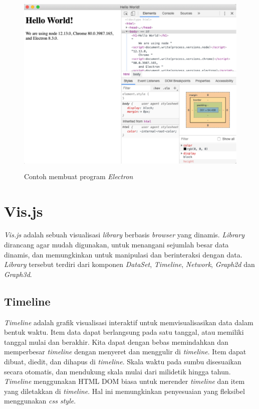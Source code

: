 \begin{enumerate}
    \begin{figure}[H]
        \centering
        \includegraphics[width=12cm, height=9cm]{Gambar/hasilContohProgramElectron.png}
        \caption{Contoh membuat program \textit{Electron}}
        \label{fig:gambarElectron}
    \end{figure}
\end{enumerate}

\section{Vis.js}
\textit{Vis.js} adalah sebuah visualisasi \textit{library} berbasis \textit{browser} yang dinamis. \textit{Library} dirancang agar mudah digunakan, untuk menangani sejumlah besar data dinamis, dan memungkinkan untuk manipulasi dan berinteraksi dengan data. \textit{Library} tersebut terdiri dari komponen \textit{DataSet}, \textit{Timeline}, \textit{Network}, \textit{Graph2d} dan \textit{Graph3d}. \cite{visjs}

\subsection{Timeline}
\textit{Timeline} adalah grafik visualisasi interaktif untuk memvisualisasikan data dalam bentuk waktu. Item data dapat berlangsung pada satu tanggal, atau memiliki tanggal mulai dan berakhir. Kita dapat dengan bebas memindahkan dan memperbesar \textit{timeline} dengan menyeret dan menggulir di \textit{timeline}. Item dapat dibuat, diedit, dan dihapus di \textit{timeline}. Skala waktu pada sumbu disesuaikan secara otomatis, dan mendukung skala mulai dari milidetik hingga tahun. \textit{Timeline} menggunakan HTML DOM biasa untuk merender \textit{timeline} dan item yang diletakkan di \textit{timeline}. Hal ini memungkinkan penyesuaian yang fleksibel menggunakan \textit{css style}. \cite{timeline}

